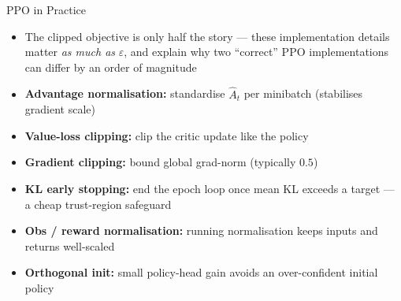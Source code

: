 \begin{frame}{PPO in Practice}
\begin{itemize}
    \item The clipped objective is only half the story --- these implementation details matter \emph{as much as} $\varepsilon$, and explain why two ``correct'' PPO implementations can differ by an order of magnitude\footnotemark
    \vspace{0.3em}
    \item \textbf{Advantage normalisation:} standardise $\hat{A}_t$ per minibatch (stabilises gradient scale)
    \item \textbf{Value-loss clipping:} clip the critic update like the policy
    \item \textbf{Gradient clipping:} bound global grad-norm (typically $0.5$)
    \item \textbf{KL early stopping:} end the epoch loop once mean KL exceeds a target --- a cheap trust-region safeguard
    \item \textbf{Obs / reward normalisation:} running normalisation keeps inputs and returns well-scaled
    \item \textbf{Orthogonal init:} small policy-head gain avoids an over-confident initial policy
\end{itemize}
\end{frame}
